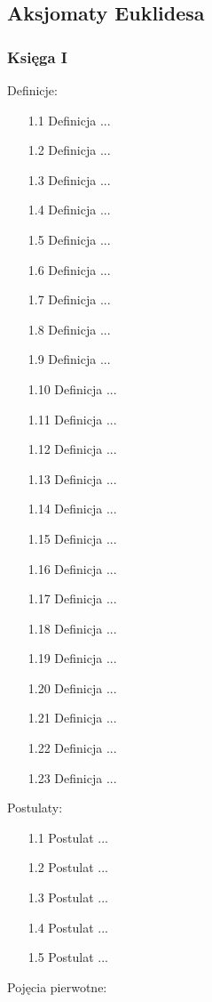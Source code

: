 %

\subsection{Aksjomaty Euklidesa}
\subsubsection{Księga I}
Definicje: \begin{enumerate}
\item [1.1] Definicja ...
\item [1.2] Definicja ...
\item [1.3] Definicja ...
\item [1.4] Definicja ...
\item [1.5] Definicja ...
\item [1.6] Definicja ...
\item [1.7] Definicja ...
\item [1.8] Definicja ...
\item [1.9] Definicja ...
\item [1.10] Definicja ...
\item [1.11] Definicja ...
\item [1.12] Definicja ...
\item [1.13] Definicja ...
\item [1.14] Definicja ...
\item [1.15] Definicja ...
\item [1.16] Definicja ...
\item [1.17] Definicja ...
\item [1.18] Definicja ...
\item [1.19] Definicja ...
\item [1.20] Definicja ...
\item [1.21] Definicja ...
\item [1.22] Definicja ...
\item [1.23] Definicja ...
\end{enumerate} Postulaty: \begin{enumerate}
\item [1.1] Postulat ...
\item [1.2] Postulat ...
\item [1.3] Postulat ...
\item [1.4] Postulat ...
\item [1.5] Postulat ...
\end{enumerate} Pojęcia pierwotne: \begin{enumerate}

\end{enumerate}
